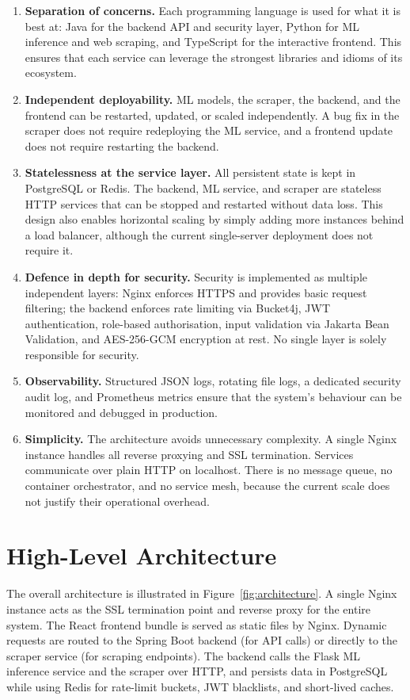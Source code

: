 \documentclass[12pt,a4paper,oneside]{report}
\begin{document}
\begin{enumerate}[leftmargin=*]
  \item \textbf{Separation of concerns.} Each programming language is
        used for what it is best at: Java for the backend API and security
        layer, Python for ML inference and web scraping, and TypeScript
        for the interactive frontend. This ensures that each service can
        leverage the strongest libraries and idioms of its ecosystem.
  \item \textbf{Independent deployability.} ML models, the scraper, the
        backend, and the frontend can be restarted, updated, or scaled
        independently. A bug fix in the scraper does not require
        redeploying the ML service, and a frontend update does not require
        restarting the backend.
  \item \textbf{Statelessness at the service layer.} All persistent state
        is kept in PostgreSQL or Redis. The backend, ML service, and
        scraper are stateless HTTP services that can be stopped and
        restarted without data loss. This design also enables horizontal
        scaling by simply adding more instances behind a load balancer,
        although the current single-server deployment does not require it.
  \item \textbf{Defence in depth for security.} Security is implemented
        as multiple independent layers: Nginx enforces HTTPS and provides
        basic request filtering; the backend enforces rate limiting via
        Bucket4j, JWT authentication, role-based authorisation, input
        validation via Jakarta Bean Validation, and AES-256-GCM encryption
        at rest. No single layer is solely responsible for security.
  \item \textbf{Observability.} Structured JSON logs, rotating file logs,
        a dedicated security audit log, and Prometheus metrics ensure that
        the system's behaviour can be monitored and debugged in production.
  \item \textbf{Simplicity.} The architecture avoids unnecessary
        complexity. A single Nginx instance handles all reverse proxying
        and SSL termination. Services communicate over plain HTTP on
        localhost. There is no message queue, no container orchestrator,
        and no service mesh, because the current scale does not justify
        their operational overhead.
\end{enumerate}

\section{High-Level Architecture}
The overall architecture is illustrated in
Figure~\ref{fig:architecture}. A single Nginx instance acts as the SSL
termination point and reverse proxy for the entire system. The React
frontend bundle is served as static files by Nginx. Dynamic requests
are routed to the Spring Boot backend (for API calls) or directly to
the scraper service (for scraping endpoints). The backend calls the
Flask ML inference service and the scraper over HTTP, and persists
data in PostgreSQL while using Redis for rate-limit buckets, JWT
blacklists, and short-lived caches.
\end{document}

